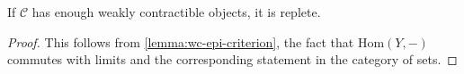 \begin{proposition}
    If $\mathcal{C}$ has enough weakly contractible objects, it is replete.
    \label{prop:wc-replete}
    \leanok
\end{proposition}

\begin{proof}
    \leanok
    This follows from \ref{lemma:wc-epi-criterion}, the fact that $\mathrm{Hom}(Y, -)$ commutes with
    limits and the corresponding statement in the category of sets.
\end{proof}
